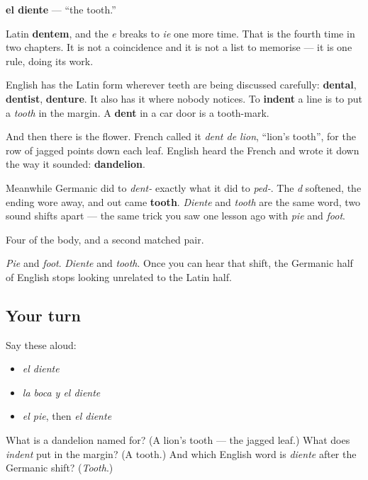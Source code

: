 \begin{cousinweb}
\textbf{el diente} — \textquotedblleft{}the tooth.\textquotedblright{}

Latin \textbf{dentem}, and the \emph{e} breaks to \emph{ie} one more time. That is the fourth time in two chapters. It is not a coincidence and it is not a list to memorise — it is one rule, doing its work.

English has the Latin form wherever teeth are being discussed carefully: \textbf{dental}, \textbf{dentist}, \textbf{denture}. It also has it where nobody notices. To \textbf{indent} a line is to put a \emph{tooth} in the margin. A \textbf{dent} in a car door is a tooth-mark.

And then there is the flower. French called it \emph{dent de lion}, \textquotedblleft{}lion's tooth\textquotedblright{}, for the row of jagged points down each leaf. English heard the French and wrote it down the way it sounded: \textbf{dandelion}.

Meanwhile Germanic did to \emph{dent-} exactly what it did to \emph{ped-}. The \emph{d} softened, the ending wore away, and out came \textbf{tooth}. \emph{Diente} and \emph{tooth} are the same word, two sound shifts apart — the same trick you saw one lesson ago with \emph{pie} and \emph{foot}.
\end{cousinweb}

\begin{grammarlens}[title={What you've built}]
Four of the body, and a second matched pair.

\emph{Pie} and \emph{foot}. \emph{Diente} and \emph{tooth}. Once you can hear that shift, the Germanic half of English stops looking unrelated to the Latin half.
\end{grammarlens}

\subsection*{Your turn}
Say these aloud:

\begin{itemize}
\raggedright
  \item \emph{el diente}
  \item \emph{la boca y el diente}
  \item \emph{el pie}, then \emph{el diente}
\end{itemize}

\begin{tcolorbox}[breakable,colback=teal!4,colframe=teal!35!black,title={Before you move on}]
What is a dandelion named for? (A lion's tooth — the jagged leaf.) What does \emph{indent} put in the margin? (A tooth.) And which English word is \emph{diente} after the Germanic shift? (\emph{Tooth}.)
\end{tcolorbox}
